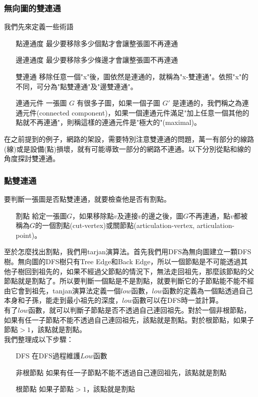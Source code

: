 \subsubsection{無向圖的雙連通}
我們先來定義一些術語
\begin{enumerate}
\item [點連通度] 最少要移除多少個點才會讓整張圖不再連通
\item [邊連通度] 最少要移除多少條邊才會讓整張圖不再連通
\item [雙連通] 移除任意一個"x"後，圖依然是連通的，就稱為"x-雙連通"。依照"x"的不同，可分為"點雙連通"及"邊雙連通"。
\item [連通元件] 一張圖 $G$ 有很多子圖，如果一個子圖 $G'$ 是連通的，我們稱之為連通元件(connected component)，如果一個連通元件滿足"加上任意一個其他的點就不再連通"，則稱這樣的連通元件是"極大的"(maximal)。
\end{enumerate}
在之前提到的例子，網路的架設，需要特別注意雙連通的問題，萬一有部分的線路(線)或是設備(點)損壞，就有可能導致一部分的網路不連通。以下分別從點和線的角度探討雙連通。
\subsubsection{點雙連通}
要判斷一張圖是否點雙連通，就要檢查他是否有割點。
\begin{enumerate}
\item [割點] 給定一張圖$G$，如果移除點$v$及連接$v$的邊之後，圖$G$不再連通，點$v$都被稱為$G$的一個割點(cut-vertex)或關節點(articulation-vertex, articulation-point)。
\end{enumerate}
至於怎麼找出割點，我們用tarjan演算法。首先我們用DFS為無向圖建立一顆DFS樹。無向圖的DFS樹只有Tree Edge和Back Edge，所以一個節點是不可能透過其他子樹回到祖先的，如果不經過父節點的情況下，無法走回祖先，那麼該節點的父節點就是割點了。所以要判斷一個點是不是割點，就要判斷它的子節點能不能不經由它會到祖先，tanjan演算法定義一個$low$函數，$low$函數的定義為一個點透過自己本身和子孫，能走到最小祖先的深度，$low$函數可以在DFS時一並計算。\\
有了$low$函數，就可以判斷子節點是否不透過自己連回祖先。對於一個非根節點，如果有任一子節點不能不透過自己連回祖先，該點就是割點。對於根節點，如果子節點$>1$，該點就是割點。\\
我們整理成以下步驟：
\begin{enumerate}
\item [DFS] 在DFS過程維護$Low$函數
\item [非根節點] 如果有任一子節點不能不透過自己連回祖先，該點就是割點
\item [根節點] 如果子節點$>1$，該點就是割點
\end{enumerate}
